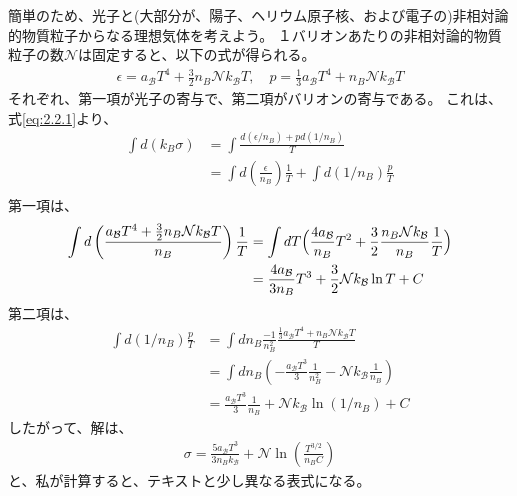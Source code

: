 \documentclass[11pt]{ltjsarticle}
\theoremstyle{plain}
\theoremstyle{break}
\begin{document}
簡単のため、光子と(大部分が、陽子、ヘリウム原子核、および電子の)非相対論的物質粒子からなる理想気体を考えよう。
１バリオンあたりの非相対論的物質粒子の数$\mathcal{N}$は固定すると、以下の式が得られる。
\begin{align}
  \epsilon=a_{\mathcal{B}} T^{4}+\frac{3}{2} n_{B} \mathcal{N} k_{\mathcal{B}} T, \quad p=\frac{1}{3} a_{\mathcal{B}} T^{4}+n_{B} \mathcal{N} k_{\mathcal{B}} T
\end{align}%
それぞれ、第一項が光子の寄与で、第二項がバリオンの寄与である。
これは、式\eqref{eq:2.2.1}より、
\begin{align}
    \int d\left(k_{B} \sigma\right)
     &=\int \frac{d\left(\epsilon / n_{B}\right)+p d\left(1 / n_{B}\right)}{T }\\
     &=\int d \left( \frac{\epsilon }{n_{B} } \right)\frac{1}{T}+ \int d \left({1 }/{ n_{B}} \right) \frac{p}{T}\\
\end{align}%
第一項は、
\begin{align}
  \int d \left( \frac{a_{\mathcal{B}} T^{4}+\frac{3}{2} n_{B} \mathcal{N} k_{\mathcal{B}} T}{n_{B} } \right)\frac{1}{T}
  &=\int dT \Bigl(  \frac{4 a_{\mathcal{B}}}{n_B} T^{2}+ \frac{3}{2} \frac{n_{B} \mathcal{N} k_{\mathcal{B}} }{n_{B} } \frac{1}{T}\Bigr) \\
  &=\frac{4 a_{\mathcal{B}}}{3 n_B} T^{3}+\frac{3}{2} \mathcal{N} k_{\mathcal{B}} \ln T +C
\end{align}%
第二項は、
\begin{align}
  \int d \left({1 }/{ n_{B}} \right) \frac{p}{T} 
  &=\int d n_{B}\frac{-1}{n_{B}^2 }\frac{\frac{1}{3} a_{\mathcal{B}} T^{4}+n_{B} \mathcal{N} k_{\mathcal{B}} T
}{T}\\
 &=\int d  n_{B} \left( - \frac{a_{\mathcal{B}}T^3 }{3 } \frac{1}{n_{B}^2 }  - \mathcal{N} k_{\mathcal{B}} \frac{1}{n_B}\right)\\
 &=  \frac{a_{\mathcal{B}}T^3 }{3 } \frac{1}{n_{B} } + \mathcal{N} k_{\mathcal{B}} \ln (1/n_B) +C
\end{align}%
したがって、解は、
\begin{align}
  \sigma=\frac{5 a_{\mathcal{B}} T^{3}}{3 n_{B} k_{\mathcal{B}}}+\mathcal{N} \ln \left(\frac{T^{3 / 2}}{n_{B} C}\right)
\end{align}%
と、私が計算すると、テキストと少し異なる表式になる。
\end{document}
